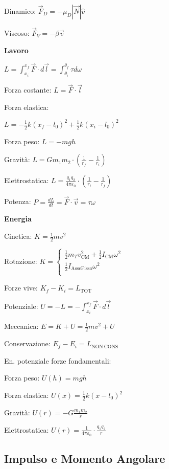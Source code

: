 \documentclass[10pt]{article}
\begin{document}
\begin{multicols}{3}
Dinamico: $\vec F_D = -\mu_D | \vec N | \hat v$

Viscoso: $\vec F_V = -\beta \vec v$

\textbf{Lavoro }

$ L = \int_{x_i}^{x_f} \vec F \cdot d\vec l = \int_{\theta_i}^{\theta_f} \tau  d\omega $

Forza costante: $L = \vec F\cdot \vec l$

Forza elastica:

$ L=-\frac 1 2 k \left( x_f - l_0 \right)^2+\frac 1 2 k \left( x_i-l_0 \right)^2$

Forza peso: $L=-mgh$

Gravit\`a: $\displaystyle L = Gm_1m_2 \cdot \left( \frac 1 {r_f} - \frac 1 {r_i} \right)$

Elettrostatica: $\displaystyle L = \frac {q_1 q_2} {4\pi \varepsilon_0}
\cdot \left( \frac 1 {r_i} - \frac 1 {r_f} \right)$

Potenza: $\displaystyle P = \frac {dL} {dt} = \vec F \cdot \vec v = \tau \omega$

\textbf{Energia}

Cinetica: $K = \frac 1 2 m v^2 $

Rotazione: $ K = \left\{ \begin{matrix}
 \frac 1 2 m_T v_\mathrm{CM}^2 + \frac 1 2 I_\mathrm{CM} \omega^2  \\
 \frac 1 2 I_\mathrm{Asse Fisso} \omega^2   \\
 \end{matrix}
 \right.
 $

Forze vive: $K_f - K_i = L_{\mathrm {TOT}}$

Potenziale: $  U = -L = -\int_{x_i}^{x_f} \vec F \cdot d\vec l$

Meccanica: $ E = K + U = \frac 1 2 m v^2 + U $

Conservazione: $E_f - E_i = L_{\mathrm{NON\ CONS}}$

En. potenziale forze fondamentali:

Forza peso: $U(h)=mgh$

Forza elastica: $U(x) = \frac 1 2 k (x-l_0)^2$

Gravit\`a: $\displaystyle U(r) = -G \frac {m_1m_2} {r}$

Elettrostatica: $\displaystyle U(r) = \frac 1 {4\pi \varepsilon_0} \cdot \frac {q_1 q_2} {r}$

\subsection*{Impulso e Momento Angolare}


\end{multicols}
\end{document}
